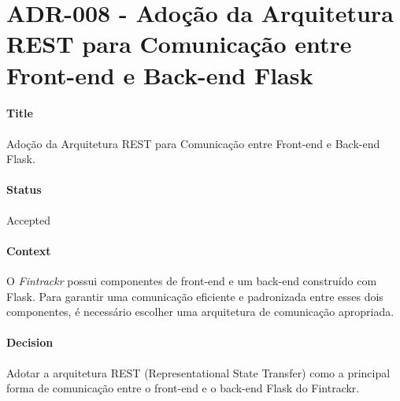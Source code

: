 \chapter{ADR-008 - Adoção da Arquitetura REST para Comunicação entre Front-end e Back-end Flask}
\label{apendiceADR008}

\subsubsection*{Title}
Adoção da Arquitetura REST para Comunicação entre Front-end e Back-end Flask.

\subsubsection*{Status}
Accepted

\subsubsection*{Context}
O \textit{Fintrackr} possui componentes de front-end e um back-end construído com Flask. Para garantir uma comunicação eficiente e padronizada entre esses dois componentes, é necessário escolher uma arquitetura de comunicação apropriada.

\subsubsection*{Decision}
Adotar a arquitetura REST (Representational State Transfer) como a principal forma de comunicação entre o front-end e o back-end Flask do Fintrackr.

